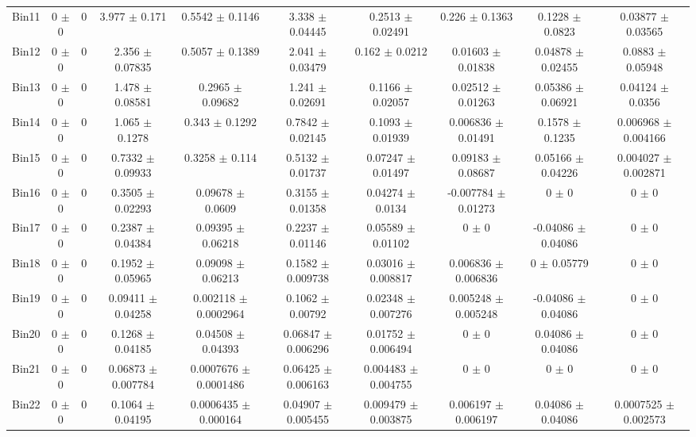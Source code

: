 \begin{tabular}{@{\extracolsep{4pt}}lccccccccc@{}}
     Bin11 & 0 $\pm$ 0 & 0 & 3.977 $\pm$ 0.171 & 0.5542 $\pm$ 0.1146 & 3.338 $\pm$ 0.04445 & 0.2513 $\pm$ 0.02491 & 0.226 $\pm$ 0.1363 & 0.1228 $\pm$ 0.0823 & 0.03877 $\pm$ 0.03565 \\ 
     Bin12 & 0 $\pm$ 0 & 0 & 2.356 $\pm$ 0.07835 & 0.5057 $\pm$ 0.1389 & 2.041 $\pm$ 0.03479 & 0.162 $\pm$ 0.0212 & 0.01603 $\pm$ 0.01838 & 0.04878 $\pm$ 0.02455 & 0.0883 $\pm$ 0.05948 \\ 
     Bin13 & 0 $\pm$ 0 & 0 & 1.478 $\pm$ 0.08581 & 0.2965 $\pm$ 0.09682 & 1.241 $\pm$ 0.02691 & 0.1166 $\pm$ 0.02057 & 0.02512 $\pm$ 0.01263 & 0.05386 $\pm$ 0.06921 & 0.04124 $\pm$ 0.0356 \\ 
     Bin14 & 0 $\pm$ 0 & 0 & 1.065 $\pm$ 0.1278 & 0.343 $\pm$ 0.1292 & 0.7842 $\pm$ 0.02145 & 0.1093 $\pm$ 0.01939 & 0.006836 $\pm$ 0.01491 & 0.1578 $\pm$ 0.1235 & 0.006968 $\pm$ 0.004166 \\ 
     Bin15 & 0 $\pm$ 0 & 0 & 0.7332 $\pm$ 0.09933 & 0.3258 $\pm$ 0.114 & 0.5132 $\pm$ 0.01737 & 0.07247 $\pm$ 0.01497 & 0.09183 $\pm$ 0.08687 & 0.05166 $\pm$ 0.04226 & 0.004027 $\pm$ 0.002871 \\ 
     Bin16 & 0 $\pm$ 0 & 0 & 0.3505 $\pm$ 0.02293 & 0.09678 $\pm$ 0.0609 & 0.3155 $\pm$ 0.01358 & 0.04274 $\pm$ 0.0134 & -0.007784 $\pm$ 0.01273 & 0 $\pm$ 0 & 0 $\pm$ 0 \\ 
     Bin17 & 0 $\pm$ 0 & 0 & 0.2387 $\pm$ 0.04384 & 0.09395 $\pm$ 0.06218 & 0.2237 $\pm$ 0.01146 & 0.05589 $\pm$ 0.01102 & 0 $\pm$ 0 & -0.04086 $\pm$ 0.04086 & 0 $\pm$ 0 \\ 
     Bin18 & 0 $\pm$ 0 & 0 & 0.1952 $\pm$ 0.05965 & 0.09098 $\pm$ 0.06213 & 0.1582 $\pm$ 0.009738 & 0.03016 $\pm$ 0.008817 & 0.006836 $\pm$ 0.006836 & 0 $\pm$ 0.05779 & 0 $\pm$ 0 \\ 
     Bin19 & 0 $\pm$ 0 & 0 & 0.09411 $\pm$ 0.04258 & 0.002118 $\pm$ 0.0002964 & 0.1062 $\pm$ 0.00792 & 0.02348 $\pm$ 0.007276 & 0.005248 $\pm$ 0.005248 & -0.04086 $\pm$ 0.04086 & 0 $\pm$ 0 \\ 
     Bin20 & 0 $\pm$ 0 & 0 & 0.1268 $\pm$ 0.04185 & 0.04508 $\pm$ 0.04393 & 0.06847 $\pm$ 0.006296 & 0.01752 $\pm$ 0.006494 & 0 $\pm$ 0 & 0.04086 $\pm$ 0.04086 & 0 $\pm$ 0 \\ 
     Bin21 & 0 $\pm$ 0 & 0 & 0.06873 $\pm$ 0.007784 & 0.0007676 $\pm$ 0.0001486 & 0.06425 $\pm$ 0.006163 & 0.004483 $\pm$ 0.004755 & 0 $\pm$ 0 & 0 $\pm$ 0 & 0 $\pm$ 0 \\ 
     Bin22 & 0 $\pm$ 0 & 0 & 0.1064 $\pm$ 0.04195 & 0.0006435 $\pm$ 0.000164 & 0.04907 $\pm$ 0.005455 & 0.009479 $\pm$ 0.003875 & 0.006197 $\pm$ 0.006197 & 0.04086 $\pm$ 0.04086 & 0.0007525 $\pm$ 0.002573 \\ 

\end{tabular}
